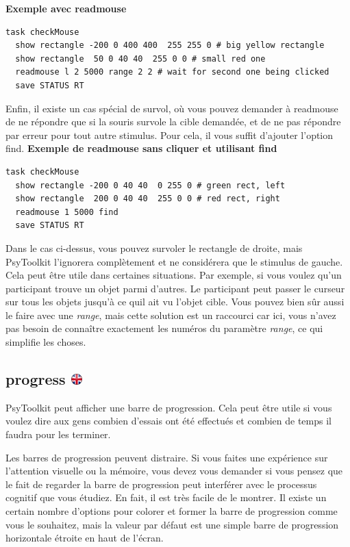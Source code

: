 \documentclass[
]{book}
\begin{document}
\textbf{Exemple avec readmouse}

\begin{verbatim}
task checkMouse
  show rectangle -200 0 400 400  255 255 0 # big yellow rectangle
  show rectangle  50 0 40 40  255 0 0 # small red one
  readmouse l 2 5000 range 2 2 # wait for second one being clicked
  save STATUS RT
\end{verbatim}

Enfin, il existe un cas spécial de survol, où vous pouvez demander à
readmouse de ne répondre que si la souris survole la cible demandée, et
de ne pas répondre par erreur pour tout autre stimulus. Pour cela, il
vous suffit d'ajouter l'option find. \textbf{Exemple de readmouse sans
cliquer et utilisant find}

\begin{verbatim}
task checkMouse
  show rectangle -200 0 40 40  0 255 0 # green rect, left
  show rectangle  200 0 40 40  255 0 0 # red rect, right
  readmouse 1 5000 find
  save STATUS RT
\end{verbatim}

Dans le cas ci-dessus, vous pouvez survoler le rectangle de droite, mais
PsyToolkit l'ignorera complètement et ne considérera que le stimulus de
gauche. Cela peut être utile dans certaines situations. Par exemple, si
vous voulez qu'un participant trouve un objet parmi d'autres. Le
participant peut passer le curseur sur tous les objets jusqu'à ce quil
ait vu l'objet cible. Vous pouvez bien sûr aussi le faire avec une
\emph{range}, mais cette solution est un raccourci car ici, vous n'avez
pas besoin de connaître exactement les numéros du paramètre
\emph{range}, ce qui simplifie les choses.

\hypertarget{progress}{%
\subsection[progress ]{\texorpdfstring{progress
\href{https://www.psytoolkit.org/doc3.2.0/syntax.html\#task-progress}{\protect\includegraphics{img/ukflag.png}}}{progress }}\label{progress}}

PsyToolkit peut afficher une barre de progression. Cela peut être utile
si vous voulez dire aux gens combien d'essais ont été effectués et
combien de temps il faudra pour les terminer.

Les barres de progression peuvent distraire. Si vous faites une
expérience sur l'attention visuelle ou la mémoire, vous devez vous
demander si vous pensez que le fait de regarder la barre de progression
peut interférer avec le processus cognitif que vous étudiez. En fait, il
est très facile de le montrer. Il existe un certain nombre d'options
pour colorer et former la barre de progression comme vous le souhaitez,
mais la valeur par défaut est une simple barre de progression
horizontale étroite en haut de l'écran.
\end{document}
